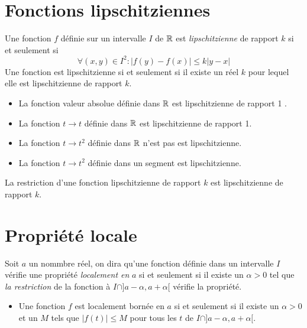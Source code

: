 \section{Fonctions lipschitziennes}
\begin{defi}
 Une fonction $f$ définie sur un intervalle $I$ de $\mathbb{R}$ est \emph{lipschitzienne} de rapport $k$ si et seulement si 
\begin{displaymath}
 \forall (x,y)\in I^2 : |f(y)-f(x)|\leq k |y-x|
\end{displaymath}
Une fonction est lipschitzienne si et seulement si il existe un réel $k$ pour lequel elle est lipschitzienne de rapport $k$.
\end{defi}
\begin{exples}
 \begin{itemize}
  \item La fonction valeur absolue définie dans $\mathbb{R}$ est lipschitzienne de rapport 1 .
  \item La fonction $t\rightarrow t$ définie dans $\mathbb{R}$ est lipschitzienne de rapport 1.
  \item La fonction $t\rightarrow t^2$ définie dans $\mathbb{R}$ n'est pas est lipschitzienne.
  \item La fonction $t\rightarrow t^2$ définie  dans un segment est lipschitzienne.
 \end{itemize}
\end{exples}
 La restriction d'une fonction lipschitzienne de rapport $k$ est lipschitzienne de rapport $k$.

\section{Propriété locale}
Soit $a$ un nommbre réel, on dira qu'une fonction définie dans un intervalle $I$ vérifie une propriété \emph{localement en } $a$ si et seulement si il existe un $\alpha >0$ tel que \emph{la restriction} de la fonction à $I\cap]a-\alpha,a+\alpha[$ vérifie la propriété.
\begin{exples}
 \begin{itemize}
  \item Une fonction $f$ est localement bornée en $a$ si et seulement si il existe un $\alpha>0$ et un $M$ tels que $|f(t)|\leq M$ pour tous les $t$ de $I\cap]a-\alpha,a+\alpha[$.
 \end{itemize}

\end{exples}



